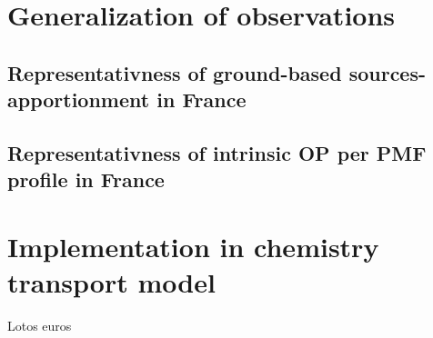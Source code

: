 
\section{Generalization of observations}%
\label{sec:generalization_of_observation}

\subsection{Representativness of ground-based sources-apportionment in France}%
\label{sub:representativness_of_ground_based_sources_apportionment_in_france}


\subsection{Representativness of intrinsic OP per PMF profile in France}%
\label{sub:representativness_of_intrinsic_op_per_pmf_profile_in_france}



\section{Implementation in chemistry transport model}%
\label{sec:implementation_in_chemistry_transport_model}

Lotos euros

